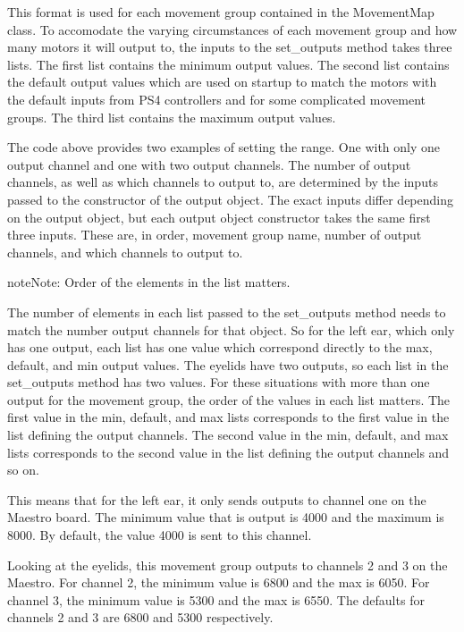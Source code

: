 \documentclass[letterpaper,10pt,english]{sphinxmanual}
\begin{document}
\sphinxAtStartPar
This format is used for each movement group contained in the MovementMap class. To
accomodate the varying circumstances of each movement group and how many motors it
will output to, the inputs to the set\_outputs method takes three lists. The first
list contains the minimum output values. The second list contains the default output
values which are used on startup to match the motors with the default inputs from
PS4 controllers and for some complicated movement groups. The third list contains
the maximum output values.

\sphinxAtStartPar
The code above provides two examples of setting the range. One with only one output
channel and one with two output channels. The number of output channels, as well as
which channels to output to, are determined by the inputs passed to the constructor
of the output object. The exact inputs differ depending on the output object, but
each output object constructor takes the same first three inputs. These are, in
order, movement group name, number of output channels, and which channels to output
to.

\begin{sphinxadmonition}{note}{Note:}
\sphinxAtStartPar
Order of the elements in the list matters.
\end{sphinxadmonition}

\sphinxAtStartPar
The number of elements in each list passed to the set\_outputs method needs to match
the number output channels for that object. So for the left ear, which only has one
output, each list has one value which correspond directly to the max, default, and min
output values. The eyelids have two outputs, so each list in the set\_outputs method has
two values. For these situations with more than one output for the movement group, the
order of the values in each list matters. The first value in the min, default, and max
lists corresponds to the first value in the list defining the output channels. The
second value in the min, default, and max lists corresponds to the second value in the
list defining the output channels and so on.

\sphinxAtStartPar
This means that for the left ear, it only sends outputs to channel one on the Maestro
board. The minimum value that is output is 4000 and the maximum is 8000. By default,
the value 4000 is sent to this channel.

\sphinxAtStartPar
Looking at the eyelids, this movement group outputs to channels 2 and 3 on the
Maestro. For channel 2, the minimum value is 6800 and the max is 6050. For channel
3, the minimum value is 5300 and the max is 6550. The defaults for channels 2 and 3
are 6800 and 5300 respectively.
\end{document}
